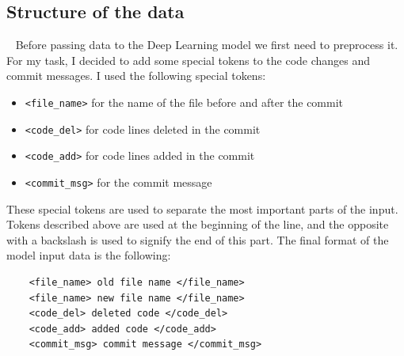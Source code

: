     

 \subsection{Structure of the data}~\label{sec:structure_of_the_data}
 Before passing data to the Deep Learning model we first need to preprocess it. For my task, I decided to add some special tokens to the code changes and commit messages. 
 I used the following special tokens:
\begin{itemize}
    \item \verb+<file_name>+ for the name of the file before and after the commit
    \item \verb+<code_del>+ for code lines deleted in the commit
    \item \verb+<code_add>+ for code lines added in the commit
    \item \verb+<commit_msg>+ for the commit message
\end{itemize}
These special tokens are used to separate the most important parts of the input. Tokens described above are used at the beginning of the line, and the opposite with a backslash is used to signify the end of this part. The final format of the model input data is the following:
 
 \begin{verbatim}
    <file_name> old file name </file_name>
    <file_name> new file name </file_name>
    <code_del> deleted code </code_del>
    <code_add> added code </code_add>
    <commit_msg> commit message </commit_msg>
\end{verbatim}
